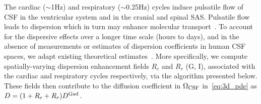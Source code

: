 The cardiac ($\sim$1Hz) and respiratory ($\sim$0.25Hz) cycles induce
pulsatile flow of CSF in the ventricular system and in the cranial and
spinal SAS. Pulsatile flow leads to dispersion which in turn may
enhance molecular transport~\cite{taylor1953dispersion,
  watson1983diffusion, asgari2016glymphatic, keith2019dispersion,
  ray2021quantitative, troyetsky2021dispersion}. To account for the
dispersive effects over a longer time scale (hours to days), and in
the absence of measurements or estimates of dispersion coefficients in
human CSF spaces, we adapt existing theoretical
estimates~\cite{watson1983diffusion, keith2019dispersion}. More
specifically, we compute spatially-varying dispersion enhancement
fields $R_c$ and $R_r$ (G, I), associated with the
cardiac and respiratory cycles respectively, via the algorithm
presented below. These fields then contribute to the diffusion
coefficient in $\Omega_{\rm CSF}$ in~\eqref{eq:3d_pde} as $D = (1 +
R_c + R_r) D^{\rm Gad}$.
